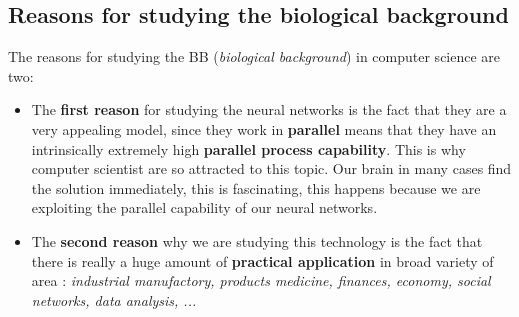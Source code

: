 \documentclass{article}
\begin{document}
\subsection{Reasons for studying the biological background}
The reasons for studying the BB (\textit{biological background}) in computer science are two:
\begin{itemize}
    \item The \textbf{first reason} for studying the neural networks is the fact that they are a very appealing model,
          since they work in \textbf{parallel} means that they have an intrinsically extremely high \textbf{parallel process capability}.
          This is why computer scientist are so attracted to this topic. Our brain in many cases find the solution immediately, this
          is fascinating, this happens because we are exploiting the parallel capability of our neural networks.
    \item The \textbf{second reason} why we are studying this technology is the fact that there is really a huge amount of \textbf{practical
              application} in broad variety of area : \textit{industrial manufactory, products medicine, finances, economy, social networks, data analysis, ...}
\end{itemize}
\end{document}
